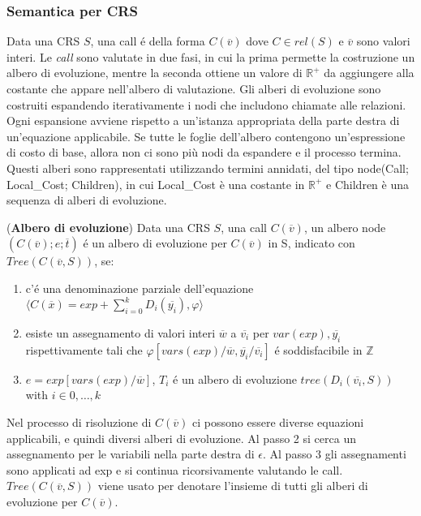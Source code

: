 \documentclass[../../main.tex]{subfiles}
\begin{document}
\subsubsection{Semantica per CRS}
Data una CRS $S$, una call é della forma $C(\overline{v})$ dove $C \in rel(S)$ e $\overline{v}$ sono valori interi.
Le \textit{call} sono valutate in due fasi, in cui la prima permette la costruzione un albero di evoluzione, mentre la seconda ottiene un valore di $\mathbb{R}^+$ da aggiungere alla costante che appare nell'albero di valutazione.
Gli alberi di evoluzione sono costruiti espandendo iterativamente i nodi che includono chiamate alle relazioni. Ogni espansione avviene rispetto a un'istanza appropriata della parte destra di un'equazione applicabile. Se tutte le foglie dell'albero contengono un'espressione di costo di base, allora non ci sono più nodi da espandere e il processo termina. Questi alberi sono rappresentati utilizzando termini annidati, del tipo node(Call; Local\_Cost; Children), in cui Local\_Cost è una costante in $\mathbb{R}^+$ e Children è una sequenza di alberi di evoluzione.

\begin{definition}(\textbf{Albero di evoluzione})
    Data una CRS $S$, una call $C(\overline{v})$, un albero node $(C(\overline{v}); e; \overline{t})$ é un albero di evoluzione per $C(\overline{v})$ in S, indicato con $Tree (C(\overline{v},S))$, se:
    \begin{enumerate}
        \item c'é una denominazione parziale dell'equazione $\langle C(\overline{x}) = exp + \sum_{i = 0}^k D_i(\overline{y_i}), \varphi \rangle$
        \item esiste un assegnamento di valori interi $\overline{w}$ a $\overline{v_i}$ per $var(exp), \overline{y_i}$ rispettivamente tali che $\varphi[vars(exp)/\overline{w}, \overline{y_i}/\overline{v_i}]$ é soddisfacibile in $\mathbb{Z}$
        \item $e = exp[vars(exp)/\overline{w}]$, $T_i$ é un albero di evoluzione  $tree(D_i (\overline{v_i}, S))$ with $i \in 0,\dots,k$ 
    \end{enumerate}
\end{definition}

Nel processo di risoluzione di $C(\overline{v})$ ci possono essere diverse equazioni applicabili, e quindi diversi alberi di evoluzione.
Al passo 2 si cerca un assegnamento per le variabili nella parte destra di $\epsilon$. Al passo 3 gli assegnamenti sono applicati ad exp e si continua ricorsivamente valutando le call.
$Tree(C(\overline{v}, S))$ viene usato per denotare l'insieme di tutti gli alberi di evoluzione per $C(\overline{v})$.
\end{document}
